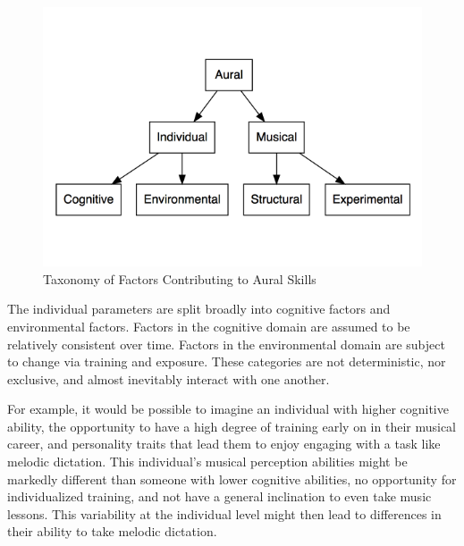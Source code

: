 \documentclass[]{book}
\begin{document}
\begin{figure}

{\centering \includegraphics[width=0.8\linewidth]{img/taxonomy4} 

}

\caption{Taxonomy of Factors Contributing to Aural Skills}\label{fig:taxonomy}
\end{figure}

The individual parameters are split broadly into cognitive factors and environmental factors.
Factors in the cognitive domain are assumed to be relatively consistent over time.
Factors in the environmental domain are subject to change via training and exposure.
These categories are not deterministic, nor exclusive, and almost inevitably interact with one another.

For example, it would be possible to imagine an individual with higher cognitive ability, the opportunity to have a high degree of training early on in their musical career, and personality traits that lead them to enjoy engaging with a task like melodic dictation.
This individual's musical perception abilities might be markedly different than someone with lower cognitive abilities, no opportunity for individualized training, and not have a general inclination to even take music lessons.
This variability at the individual level might then lead to differences in their ability to take melodic dictation.
\end{document}
